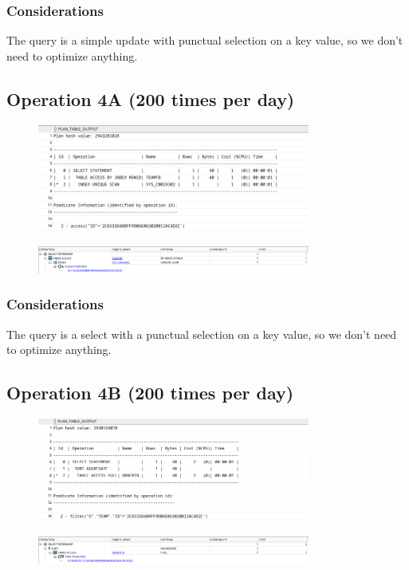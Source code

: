 \subsubsection*{Considerations}
The query is a simple update with punctual selection on a key value, so we don't need to optimize anything.

\subsection*{Operation 4A (200 times per day)}
\begin{figure}[H]
    \centering
    \includegraphics[width=0.8\textwidth]{img/phys/op4A-1.png}
\end{figure}
\begin{figure}[H]
    \centering
    \includegraphics[width=0.8\textwidth]{img/phys/op4A-2.png}
\end{figure}
\subsubsection*{Considerations}
The query is a select with a punctual selection on a key value, so we don't need to optimize anything.

\subsection*{Operation 4B (200 times per day)}
\begin{figure}[H]
    \centering
    \includegraphics[width=0.8\textwidth]{img/phys/op4B-1.png}
\end{figure}
\begin{figure}[H]
    \centering
    \includegraphics[width=0.8\textwidth]{img/phys/op4B-2.png}
\end{figure}
